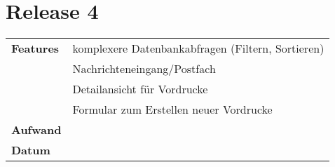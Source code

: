 \section*{Release 4}
\label{sec:release_4}

\begin{tabular}{p{5cm} p{9cm}}
    \textbf{Features} & komplexere Datenbankabfragen (Filtern, Sortieren) \\
    & Nachrichteneingang/Postfach \\
    & Detailansicht für Vordrucke \\
    & Formular zum Erstellen neuer Vordrucke \\
    \hline
    \textbf{Aufwand} & \\
    \hline
    \textbf{Datum} & 
\end{tabular}